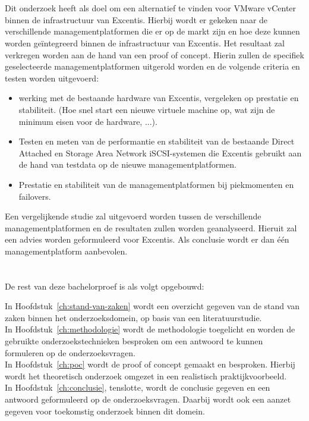 \section{}%
\label{sec:onderzoeksdoelstelling}
Dit onderzoek heeft als doel om een alternatief te vinden voor VMware vCenter binnen de infrastructuur van Excentis. Hierbij wordt er gekeken naar de verschillende managementplatformen die er op de markt zijn en hoe deze kunnen worden geïntegreerd binnen de infrastructuur van Excentis.
Het resultaat zal verkregen worden aan de hand van een proof of concept. Hierin zullen de specifiek geselecteerde managementplatformen uitgerold worden en de volgende criteria en testen worden uitgevoerd:
\begin{itemize}
  \item werking met de bestaande hardware van Excentis, vergeleken op prestatie en stabiliteit. (Hoe snel start een nieuwe virtuele machine op, wat zijn de minimum eisen voor de hardware, ...).
  \item Testen en meten van de performantie en stabiliteit van de bestaande Direct Attached en Storage Area Network iSCSI-systemen die Excentis gebruikt aan de hand van testdata op de nieuwe managementplatformen.
  \item Prestatie en stabiliteit van de managementplatformen bij piekmomenten en failovers.
\end{itemize}
Een vergelijkende studie zal uitgevoerd worden tussen de verschillende managementplatformen en de resultaten zullen worden geanalyseerd. Hieruit zal een advies worden geformuleerd voor Excentis.
Als conclusie wordt er dan één managementplatform aanbevolen.


\section{}%
\label{sec:opzet-bachelorproef}


De rest van deze bachelorproef is als volgt opgebouwd:

In Hoofdstuk~\ref{ch:stand-van-zaken} wordt een overzicht gegeven van de stand van zaken binnen het onderzoeksdomein, op basis van een literatuurstudie. \\
In Hoofdstuk~\ref{ch:methodologie} wordt de methodologie toegelicht en worden de gebruikte onderzoekstechnieken besproken om een antwoord te kunnen formuleren op de onderzoeksvragen. \\
In Hoofdstuk~\ref{ch:poc} wordt de proof of concept gemaakt en besproken. Hierbij wordt het theoretisch onderzoek omgezet in een realistisch praktijkvoorbeeld. \\

In Hoofdstuk~\ref{ch:conclusie}, tenslotte, wordt de conclusie gegeven en een antwoord geformuleerd op de onderzoeksvragen. Daarbij wordt ook een aanzet gegeven voor toekomstig onderzoek binnen dit domein.